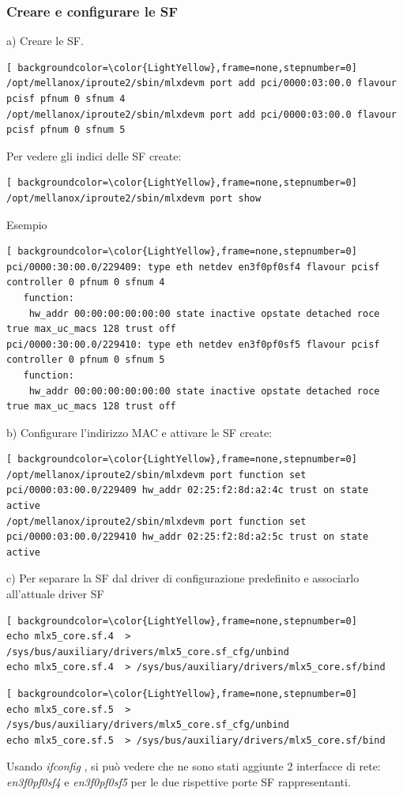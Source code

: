 \documentclass[binding=0.6cm]{sapthesis}
\theoremstyle{definition}
\begin{document}
\subsubsection{Creare e configurare le SF}
a) Creare le SF.
\begin{lstlisting}[ backgroundcolor=\color{LightYellow},frame=none,stepnumber=0]
/opt/mellanox/iproute2/sbin/mlxdevm port add pci/0000:03:00.0 flavour pcisf pfnum 0 sfnum 4
/opt/mellanox/iproute2/sbin/mlxdevm port add pci/0000:03:00.0 flavour pcisf pfnum 0 sfnum 5 
\end{lstlisting}
Per vedere gli indici delle SF create:
\begin{lstlisting}[ backgroundcolor=\color{LightYellow},frame=none,stepnumber=0]
/opt/mellanox/iproute2/sbin/mlxdevm port show
\end{lstlisting}
Esempio
\begin{lstlisting}[ backgroundcolor=\color{LightYellow},frame=none,stepnumber=0]
pci/0000:30:00.0/229409: type eth netdev en3f0pf0sf4 flavour pcisf controller 0 pfnum 0 sfnum 4 
   function:
	hw_addr 00:00:00:00:00:00 state inactive opstate detached roce true max_uc_macs 128 trust off
pci/0000:30:00.0/229410: type eth netdev en3f0pf0sf5 flavour pcisf controller 0 pfnum 0 sfnum 5
   function:
	hw_addr 00:00:00:00:00:00 state inactive opstate detached roce true max_uc_macs 128 trust off
\end{lstlisting}
b) Configurare l'indirizzo MAC e attivare le SF create:
\begin{lstlisting}[ backgroundcolor=\color{LightYellow},frame=none,stepnumber=0]
/opt/mellanox/iproute2/sbin/mlxdevm port function set pci/0000:03:00.0/229409 hw_addr 02:25:f2:8d:a2:4c trust on state active
/opt/mellanox/iproute2/sbin/mlxdevm port function set pci/0000:03:00.0/229410 hw_addr 02:25:f2:8d:a2:5c trust on state active
\end{lstlisting}
c) Per separare la SF dal driver di configurazione predefinito e associarlo all'attuale driver SF 
\begin{lstlisting}[ backgroundcolor=\color{LightYellow},frame=none,stepnumber=0]
echo mlx5_core.sf.4  > /sys/bus/auxiliary/drivers/mlx5_core.sf_cfg/unbind
echo mlx5_core.sf.4  > /sys/bus/auxiliary/drivers/mlx5_core.sf/bind
\end{lstlisting}
\begin{lstlisting}[ backgroundcolor=\color{LightYellow},frame=none,stepnumber=0]
echo mlx5_core.sf.5  > /sys/bus/auxiliary/drivers/mlx5_core.sf_cfg/unbind
echo mlx5_core.sf.5  > /sys/bus/auxiliary/drivers/mlx5_core.sf/bind
\end{lstlisting}
Usando \textsl{ifconfig} , si può vedere che ne sono stati aggiunte 2 interfacce di rete: \textsl{en3f0pf0sf4} e \textsl{en3f0pf0sf5} per le due rispettive porte SF rappresentanti. 
\end{document}
